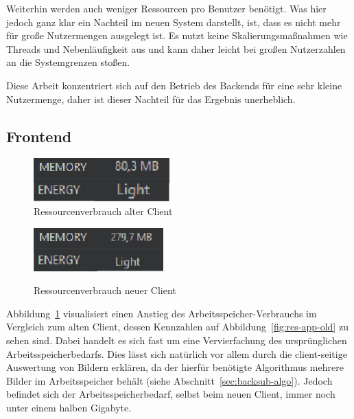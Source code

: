 Weiterhin werden auch weniger Ressourcen pro Benutzer benötigt.
Was hier jedoch ganz klar ein Nachteil im neuen System darstellt, ist, dass es nicht mehr für große Nutzermengen ausgelegt ist.
Es nutzt keine Skalierungsmaßnahmen wie Threads und Nebenläufigkeit aus und kann daher leicht bei großen Nutzerzahlen an die Systemgrenzen stoßen.

Diese Arbeit konzentriert sich auf den Betrieb des Backends für eine sehr kleine Nutzermenge, daher ist dieser Nachteil für das Ergebnis unerheblich.

\subsection{Frontend}
\begin{figure}[ht]
  \centering
	\begin{minipage}[b]{0.4\textwidth}
     \includegraphics[width=\textwidth]{Bilder/res-app-old} \\
   \caption{Ressourcenverbrauch alter Client}
   \label{fig:res-app-old}
  \end{minipage}
	\hfill
	\begin{minipage}[b]{0.4\textwidth}
     \includegraphics[width=\textwidth]{Bilder/res-app-new} \\
		\caption{Ressourcenverbrauch neuer Client}
		\label{fig:res-app-new}
	\end{minipage}
\end{figure}

Abbildung~\ref{fig:res-app-new} visualisiert einen Anstieg des Arbeitsspeicher-Verbrauchs im Vergleich zum alten Client, dessen Kennzahlen auf Abbildung~\ref{fig:res-app-old} zu sehen sind.
Dabei handelt es sich fast um eine Vervierfachung des ursprünglichen Arbeitsspeicherbedarfs.
Dies lässt sich natürlich vor allem durch die client-seitige Auswertung von Bildern erklären, da der hierfür benötigte Algorithmus mehrere Bilder im Arbeitsspeicher behält (siehe Abschnitt~\ref{sec:backsub-algo}).
Jedoch befindet sich der Arbeitsspeicherbedarf, selbst beim neuen Client, immer noch unter einem halben Gigabyte.

